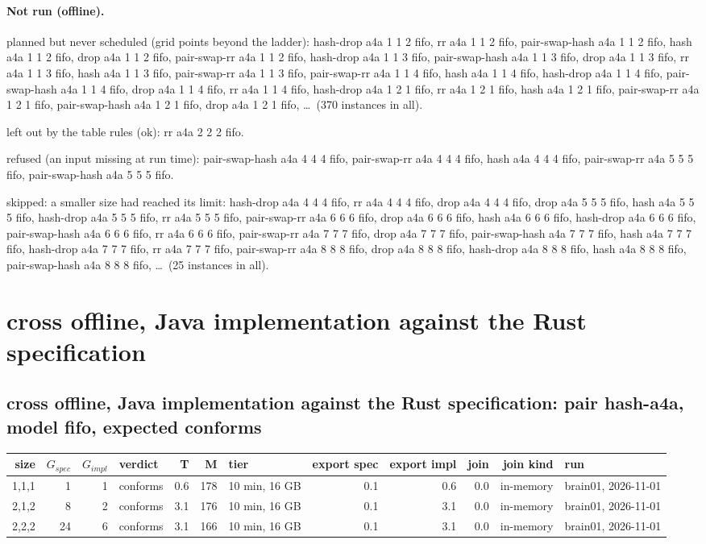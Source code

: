 \documentclass[10pt]{article}
\begin{document}
\paragraph{Not run (offline).}
planned but never scheduled (grid points beyond the ladder): hash-drop a4a 1 1 2 fifo, rr a4a 1 1 2 fifo, pair-swap-hash a4a 1 1 2 fifo, hash a4a 1 1 2 fifo, drop a4a 1 1 2 fifo, pair-swap-rr a4a 1 1 2 fifo, hash-drop a4a 1 1 3 fifo, pair-swap-hash a4a 1 1 3 fifo, drop a4a 1 1 3 fifo, rr a4a 1 1 3 fifo, hash a4a 1 1 3 fifo, pair-swap-rr a4a 1 1 3 fifo, pair-swap-rr a4a 1 1 4 fifo, hash a4a 1 1 4 fifo, hash-drop a4a 1 1 4 fifo, pair-swap-hash a4a 1 1 4 fifo, drop a4a 1 1 4 fifo, rr a4a 1 1 4 fifo, hash-drop a4a 1 2 1 fifo, rr a4a 1 2 1 fifo, hash a4a 1 2 1 fifo, pair-swap-rr a4a 1 2 1 fifo, pair-swap-hash a4a 1 2 1 fifo, drop a4a 1 2 1 fifo, \ldots\ (370 instances in all).\par
left out by the table rules (ok): rr a4a 2 2 2 fifo.\par
refused (an input missing at run time): pair-swap-hash a4a 4 4 4 fifo, pair-swap-rr a4a 4 4 4 fifo, hash a4a 4 4 4 fifo, pair-swap-rr a4a 5 5 5 fifo, pair-swap-hash a4a 5 5 5 fifo.\par
skipped: a smaller size had reached its limit: hash-drop a4a 4 4 4 fifo, rr a4a 4 4 4 fifo, drop a4a 4 4 4 fifo, drop a4a 5 5 5 fifo, hash a4a 5 5 5 fifo, hash-drop a4a 5 5 5 fifo, rr a4a 5 5 5 fifo, pair-swap-rr a4a 6 6 6 fifo, drop a4a 6 6 6 fifo, hash a4a 6 6 6 fifo, hash-drop a4a 6 6 6 fifo, pair-swap-hash a4a 6 6 6 fifo, rr a4a 6 6 6 fifo, pair-swap-rr a4a 7 7 7 fifo, drop a4a 7 7 7 fifo, pair-swap-hash a4a 7 7 7 fifo, hash a4a 7 7 7 fifo, hash-drop a4a 7 7 7 fifo, rr a4a 7 7 7 fifo, pair-swap-rr a4a 8 8 8 fifo, drop a4a 8 8 8 fifo, hash-drop a4a 8 8 8 fifo, hash a4a 8 8 8 fifo, pair-swap-hash a4a 8 8 8 fifo, \ldots\ (25 instances in all).\par
\section*{cross offline, Java implementation against the Rust specification}
\subsection*{cross offline, Java implementation against the Rust specification: pair \textsf{hash-a4a}, model fifo, expected conforms}
\begin{longtable}{@{}rrrlrrlrrrrl@{}}
\toprule
size & $G_{\mathit{spec}}$ & $G_{\mathit{impl}}$ & verdict & T & M & tier & export spec & export impl & join & join kind & run \\
\midrule
\endhead
\color{red} 1,1,1 & 1 & 1 & conforms & 0.6 & 178 & 10 min, 16 GB & 0.1 & 0.6 & 0.0 & in-memory & brain01, 2026-11-01 \\
\color{red} 2,1,2 & 8 & 2 & conforms & 3.1 & 176 & 10 min, 16 GB & 0.1 & 3.1 & 0.0 & in-memory & brain01, 2026-11-01 \\
\color{red} 2,2,2 & 24 & 6 & conforms & 3.1 & 166 & 10 min, 16 GB & 0.1 & 3.1 & 0.0 & in-memory & brain01, 2026-11-01 \\
\bottomrule
\end{longtable}
\end{document}
